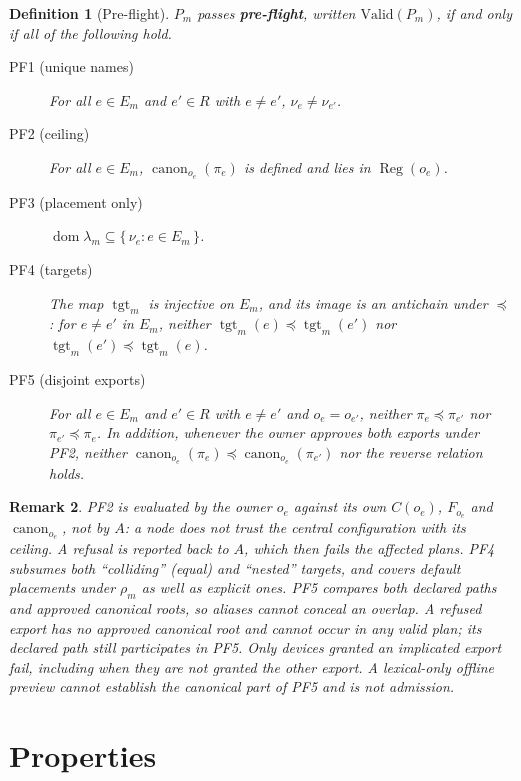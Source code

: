 \documentclass[11pt]{article}
\DeclareMathOperator{\Reg}{Reg}
\DeclareMathOperator{\canon}{canon}
\DeclareMathOperator{\tgt}{tgt}
\DeclareMathOperator{\dom}{dom}
\newcommand{\PF}[1]{\textsf{PF#1}}
\theoremstyle{definitionbreak}
\newtheorem{definition}{Definition}[section]
\theoremstyle{plainbreak}
\theoremstyle{remarkbreak}
\newtheorem{remark}[definition]{Remark}
\begin{document}
\begin{definition}[Pre-flight]\label{def:preflight}
$P_m$ passes \textbf{pre-flight}, written $\mathrm{Valid}(P_m)$, if and only if all of the
following hold.
\begin{description}
    \item[\PF{1} (unique names)] For all $e \in E_m$ and $e' \in R$ with $e \neq e'$,
    $\nu_e \neq \nu_{e'}$.
    \item[\PF{2} (ceiling)] For all $e \in E_m$, $\canon_{o_e}(\pi_e)$ is defined and lies in
    $\Reg(o_e)$.
    \item[\PF{3} (placement only)] $\dom \lambda_m \subseteq \{\, \nu_e : e \in E_m \,\}$.
    \item[\PF{4} (targets)] The map $\tgt_m$ is injective on $E_m$, and its image is an
    antichain under $\preceq$: for $e \neq e'$ in $E_m$, neither
    $\tgt_m(e) \preceq \tgt_m(e')$ nor $\tgt_m(e') \preceq \tgt_m(e)$.
    \item[\PF{5} (disjoint exports)] For all $e \in E_m$ and $e' \in R$ with $e \neq e'$
    and $o_e = o_{e'}$, neither $\pi_e \preceq \pi_{e'}$ nor $\pi_{e'} \preceq \pi_e$.
    In addition, whenever the owner approves both exports under \PF{2}, neither
    $\canon_{o_e}(\pi_e) \preceq \canon_{o_e}(\pi_{e'})$ nor the reverse relation holds.
\end{description}
\end{definition}

\begin{remark}
\PF{2} is evaluated by the owner $o_e$ against its own $C(o_e)$, $F_{o_e}$ and $\canon_{o_e}$,
not by $A$: a node does not trust the central configuration with its ceiling. A refusal is
reported back to $A$, which then fails the affected plans. \PF{4} subsumes both
``colliding'' (equal) and ``nested'' targets, and covers default placements under $\rho_m$ as
well as explicit ones. \PF{5} compares both declared paths and approved canonical roots, so aliases
cannot conceal an overlap. A refused export has no approved canonical root and cannot occur in
any valid plan; its declared path still participates in \PF{5}. Only devices granted an
implicated export fail, including when they are not granted the other export. A lexical-only
offline preview cannot establish the canonical part of \PF{5} and is not admission.
\end{remark}

\section{Properties}
\end{document}
